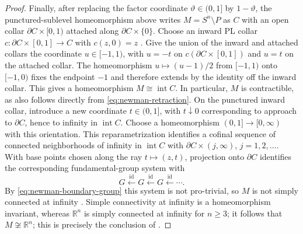 \documentclass[12pt,oneside,a4paper]{article}
\theoremstyle{mytheorem}
\theoremstyle{remark}
\theoremstyle{definition}
\begin{document}
\begin{proof}
Finally, after replacing the factor coordinate $\vartheta\in(0,1]$ by
$1-\vartheta$,
the punctured-sublevel homeomorphism above writes $M=S^n\setminus P$
as $C$ with an open collar $\partial C\times[0,1)$ attached along
$\partial C\times\{0\}$.  Choose an inward PL collar
$c:\partial C\times[0,1]\to C$ with $c(z,0)=z$
\cite[Corollary~2.5]{zbMATH01714503}.  Give the union of the inward and
attached collars the coordinate $u\in[-1,1)$, with $u=-t$ on
$c(\partial C\times[0,1])$ and $u=t$ on the attached collar.  The
homeomorphism $u\mapsto(u-1)/2$ from $[-1,1)$ onto $[-1,0)$ fixes the
endpoint $-1$ and therefore extends by the identity off the inward
collar.  This gives a homeomorphism
$M\cong\operatorname{int}C$.  In particular, $M$ is contractible, as also
follows directly from \eqref{eq:newman-retraction}.  On the punctured
inward collar, introduce a new coordinate $t\in(0,1]$, with
$t\downarrow0$ corresponding to approach to $\partial C$, hence to
infinity in $\operatorname{int}C$.  Choose a homeomorphism
$(0,1]\to[0,\infty)$ with this orientation.  This reparametrization
identifies a cofinal sequence of
connected neighborhoods of infinity in
$\operatorname{int}C$ with
\(\partial C\times(j,\infty)\), \(j=1,2,\ldots\).
With base points chosen along the ray $t\mapsto(z,t)$, projection onto
$\partial C$ identifies the corresponding fundamental-group system
with
\[
 G\xleftarrow{\mathrm{id}}G\xleftarrow{\mathrm{id}}G
 \xleftarrow{\mathrm{id}}\cdots.
\]
By \eqref{eq:newman-boundary-group} this system is not pro-trivial, so
$M$ is not simply connected at infinity
\cite[Example~3.2.16 and Proposition~3.4.36(a)]{zbMATH07206284}.  Simple connectivity at infinity
is a homeomorphism invariant, whereas $\mathbb R^n$ is simply connected
at infinity for $n\geq3$; it follows that
$M\not\cong\mathbb R^n$; this is precisely the conclusion of
\cite[Theorem~3.5.2]{zbMATH07206284}.


\end{proof}
\end{document}
